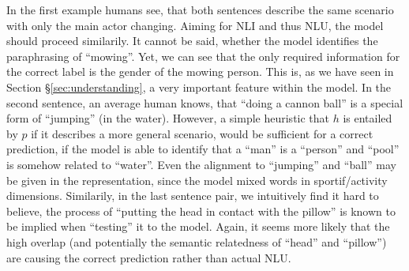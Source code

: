 In the first example humans see, that both sentences describe the same scenario with only the main actor changing. Aiming for \ac{NLI} and thus \ac{NLU}, the model should proceed similarily. It cannot be said, whether the model identifies the paraphrasing of ``mowing''. Yet, we can see that the only required information for the correct label is the gender of the mowing person. This is, as we have seen in Section §\ref{sec:understanding}, a very important feature within the model. In the second sentence, an average human knows, that ``doing a cannon ball'' is a special form of ``jumping'' (in the water). However, a simple heuristic that $h$ is entailed by $p$ if it describes a more general scenario, would be sufficient for a correct prediction, if the model is able to identify that a ``man'' is a ``person'' and ``pool'' is somehow related to ``water''. Even the alignment to ``jumping'' and ``ball'' may be given in the representation, since the model mixed words in sportif/activity dimensions. Similarily, in the last sentence pair, we intuitively find it hard to believe, the process of ``putting the head in contact with the pillow'' is known to be implied when ``testing'' it to the model. Again, it seems more likely that the high overlap (and potentially the semantic relatedness of ``head'' and ``pillow'') are causing the correct prediction rather than actual \ac{NLU}. 

